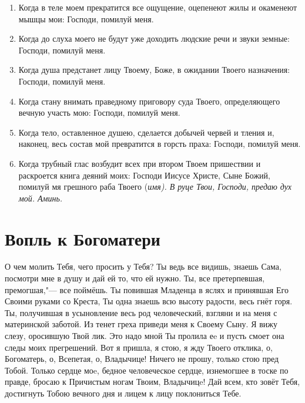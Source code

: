 \begin{mymulticols}
\begin{enumerate}
\item Когда в теле моем прекратится все ощущение, оцепенеют жилы и окаменеют мышцы мои: Господи, помилуй меня. 

\item Когда до слуха моего не будут уже доходить людские речи и звуки земные: Господи, помилуй меня. 

\item Когда душа предстанет лицу Твоему, Боже, в ожидании Твоего назначения: Господи, помилуй меня. 

\item Когда стану внимать праведному приговору суда Твоего, определяющего вечную участь мою: Господи, помилуй меня. 

\item Когда тело, оставленное душею, сделается добычей червей и тления и, наконец, весь состав мой превратится в горсть праха: Господи, помилуй меня. 

\item Когда трубный глас возбудит всех при втором Твоем пришествии и раскроется книга деяний моих: Господи Иисусе Христе, Сыне Божий, помилуй мя грешного раба Твоего (\itshape имя\normalfont{}). В руце Твои, Господи, предаю дух мой. Аминь. 

\end{enumerate}

\end{mymulticols}

\section{Вопль к Богоматери}\begin{mymulticols}
 

О чем молить Тебя, чего просить у Тебя? Ты ведь все видишь, знаешь Сама, посмотри мне в душу и дай ей то, что ей нужно. Ты, все претерпевшая, премогшая,"--- все поймёшь. Ты повившая Младенца в яслях и принявшая Его Своими руками со Креста, Ты одна знаешь всю высоту радости, весь гнёт горя. Ты, получившая в усыновление весь род человеческий, взгляни и на меня с материнской заботой. Из тенет греха приведи меня к Своему Сыну. Я вижу слезу, оросившую Твой лик. Это надо мной Ты пролила еe и пусть смоет она следы моих прегрешений. Вот я пришла, я стою, я жду Твоего отклика, о, Богоматерь, о, Всепетая, о, Владычице! Ничего не прошу, только стою пред Тобой. Только сердце моe, бедное человеческое сердце, изнемогшее в тоске по правде, бросаю к Причистым ногам Твоим, Владычицe! Дай всем, кто зовёт Тебя, достигнуть Тобою вечного дня и лицем к лицу поклониться Тебе.

\end{mymulticols}


